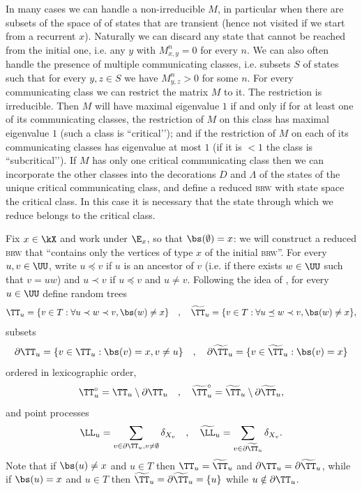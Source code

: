\documentclass[10pt,a4paper]{article}
\newcommand{\brw}{\textsc{brw}\xspace}
\begin{document}
\begin{remark}
In many cases we can handle a non-irreducible $M$, in particular when there are subsets of the space of of states that are transient (hence not visited if we start from a recurrent $x$). Naturally we can discard any state that cannot be reached from the initial one, i.e. any $y$ with $M^n_{x,y} = 0$ for every $n$. We can also often handle the presence of multiple communicating classes, i.e. subsets $S$ of states such that for every $y,z\in S$ we have $M^n_{y,z}>0$ for some $n$. For every communicating class we can restrict the matrix $M$ to it. The restriction is irreducible. Then $M$ will have maximal eigenvalue $1$ if and only if for at least one of its communicating classes, the restriction of $M$ on this class has maximal eigenvalue $1$ (such a class is ``critical’’); and if the restriction of $M$ on each of its communicating classes has eigenvalue at most $1$ (if it is $<1$ the class is ``subcritical’’). If $M$ has only one critical communicating class then we can incorporate the other classes into the decorations $D$ and $\Lambda$ of the states of the unique critical communicating class, and define a reduced \brw with state space the critical class. In this case it is necessary that the state through which we reduce belongs to the critical class. 
\end{remark}

Fix $x\in\kX$ and work under $\E_x$, so that $\bs(\emptyset) = x$: we will construct a reduced \brw that ``contains only the vertices of type $x$ of the initial \brw{}''. For every $u,v\in\UU$, write $u \preceq v$ if $u$ is an ancestor of $v$ (i.e. if there exists $w\in\UU$ such that $v = uw$) and $u\prec v$ if $u\preceq v$ and $u\neq v$. 
Following the idea of \cite[Definition 1]{raphaelis2017scaling}, for every $u\in\UU$ define random trees 
\[ \TT_u = \{ v\in T : \forall u \prec w \prec v, \bs(w) \neq x \} \quad , \quad
 \widetilde\TT_u = \{v\in T: \forall u \preceq w \prec v, \bs(w) \neq x\} , \]
subsets
\[ 
\partial\TT_u = \{ v\in \TT_u: \bs(v) = x, v\neq u\} \quad , \quad \partial\widetilde\TT_u = \{v\in\widetilde\TT_u : \bs(v)=x\} 
\]
ordered in lexicographic order, 
\[ \TT_u^\circ = \TT_u \setminus \partial\TT_u \quad , \quad \widetilde\TT_u^\circ = \widetilde\TT_u \setminus \partial\widetilde\TT_u , \]
and point processes 
\[
 \LL_u = \sum_{v\in\partial\TT_u, v\neq\emptyset} \delta_{X_v} \quad , \quad \widetilde\LL_u = \sum_{v\in\partial\widetilde\TT_u} \delta_{X_v} .
\]
Note that if $\bs(u) \neq x$ and $u\in T$ then $\TT_u = \widetilde\TT_u$ and $\partial\TT_u = \partial\widetilde\TT_u$, while if $\bs(u) = x$ and $u\in T$ then $\widetilde{\TT}_u = \partial\widetilde\TT_u = \{u\}$ while $u\notin\partial\TT_u$. 
\end{document}
